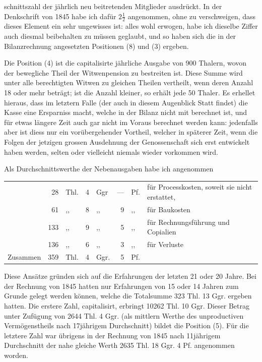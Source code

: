 schnittszahl der jährlich neu beitretenden Mitglieder ausdrückt. In der Denkschrift von 1845 habe ich dafür \(2\tfrac{1}{2}\) angenommen, ohne zu verschweigen, dass dieses Element ein sehr ungewisses ist: alles wohl erwogen, habe ich dieselbe Ziffer auch diesmal beibehalten zu müssen geglaubt, und so haben sich die in der Bilanzrechnung angesetzten Positionen (8) und (3) ergeben.

Die Position (4) ist die capitalisirte jährliche Ausgabe von 900 Thalern, wovon der bewegliche Theil der Witwenpension zu bestreiten ist. Diese Summe wird unter alle berechtigten Witwen zu gleichen Theilen vertheilt, wenn deren Anzahl 18 oder mehr beträgt; ist die Anzahl kleiner, so erhält jede 50 Thaler. Es erhellet hieraus, dass im letztern Falle (der auch in diesem Augenblick Statt findet) die Kasse eine Ersparniss macht, welche in der Bilanz nicht mit berechnet ist, und für etwas längere Zeit auch gar nicht im Voraus berechnet werden kann: jedenfalls aber ist diess nur ein vorübergehender Vortheil, welcher in späterer Zeit, wenn die Folgen der jetzigen grossen Ausdehnung der Genossenschaft sich erst entwickelt haben werden, selten oder vielleicht niemals wieder vorkommen wird.

Als Durchschnittswerthe der Nebenausgaben habe ich angenommen
\begin{center}
\small\setlength{\tabcolsep}{2pt}
\begin{tabular}{r r l r l r l p{196pt}}
&28&Thl.&4&Ggr&—&Pf.&für Processkosten, soweit sie nicht erstattet,\\
&61&,,&8&,,&9&,,&für Baukosten\\
&133&,,&9&,,&5&,,&für Rechnungsführung und Copialien\\
&136&,,&6&,,&3&,,&für Verluste\\
Zusammen&359&Thl.&4&Ggr.&5&Pf.&
\end{tabular}
\end{center}
\noindent\hspace*{\parindent}Diese Ansätze gründen sich auf die Erfahrungen der letzten 21 oder 20 Jahre. Bei der Rechnung von 1845 hatten nur Erfahrungen von 15 oder 14 Jahren zum Grunde gelegt werden können, welche die Totalsumme 323 Thl. 13 Ggr. ergeben hatten. Die erstere Zahl, capitalisirt, erbringt 10262 Thl. 10 Ggr. Dieser Betrag unter Zufügung von 2644 Thl. 4 Ggr. (als mittlern Werthe des unproductiven Vermögenstheils nach 17jährigem Durchschnitt) bildet die Position (5). Für die letztere Zahl war übrigens in der Rechnung von 1845 nach 11jährigem Durchschnitt der nahe gleiche Werth 2635 Thl. 18 Ggr. 4 Pf. angenommen worden.

